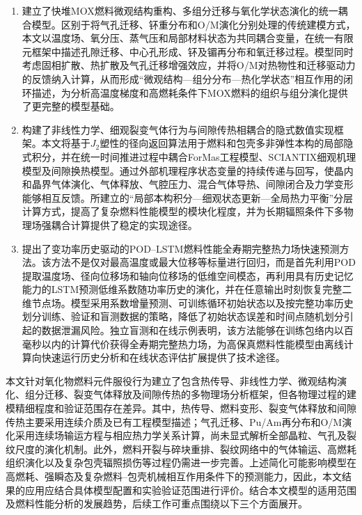 \begin{enumerate}[label={（\arabic*）},leftmargin=2.8em]
	\item 建立了快堆MOX燃料微观结构重构、多组分迁移与氧化学状态演化的统一耦合模型。区别于将气孔迁移、钚重分布和O/M演化分别处理的传统建模方式，本文以温度场、氧分压、蒸气压和局部材料状态为共同耦合变量，在统一有限元框架中描述孔隙迁移、中心孔形成、钚及镅再分布和氧迁移过程。模型同时考虑固相扩散、热扩散及气孔迁移增强效应，并将O/M对热物性和迁移驱动力的反馈纳入计算，从而形成“微观结构—组分分布—热化学状态”相互作用的闭环描述，为分析高温度梯度和高燃耗条件下MOX燃料的组织与组分演化提供了更完整的模型基础。
	
	\item 构建了非线性力学、细观裂变气体行为与间隙传热相耦合的隐式数值实现框架。本文将基于$J_2$塑性的径向返回算法用于燃料和包壳多非弹性本构的局部隐式积分，并在统一时间推进过程中耦合ForMas工程模型、SCIANTIX细观机理模型及间隙换热模型。通过外部机理程序状态变量的持续传递与回写，使晶内和晶界气体演化、气体释放、气腔压力、混合气体导热、间隙闭合及力学变形能够相互反馈。所建立的“局部本构积分—细观状态更新—全局热力平衡”分层计算方式，提高了复杂燃料性能模型的模块化程度，并为长期辐照条件下多物理场强耦合计算提供了稳定的实现途径。
	
	\item 提出了变功率历史驱动的POD--LSTM燃料性能全寿期完整热力场快速预测方法。该方法不是仅对最高温度或最大位移等标量进行回归，而是首先利用POD提取温度场、径向位移场和轴向位移场的低维空间模态，再利用具有历史记忆能力的LSTM预测低维系数随功率历史的演化，并在任意输出时刻恢复完整二维节点场。模型采用系数增量预测、可训练循环初始状态以及按完整功率历史划分训练、验证和盲测数据的策略，降低了初始状态误差和时间点随机划分引起的数据泄漏风险。独立盲测和在线示例表明，该方法能够在训练包络内以百毫秒以内的计算代价获得全寿期完整热力场，为高保真燃料性能模型由离线计算向快速运行历史分析和在线状态评估扩展提供了技术途径。
\end{enumerate}


本文针对氧化物燃料元件服役行为建立了包含热传导、非线性力学、微观结构演化、组分迁移、裂变气体释放及间隙传热的多物理场分析框架，但各物理过程的建模精细程度和验证范围存在差异。其中，热传导、燃料变形、裂变气体释放和间隙传热主要采用连续介质及已有工程模型描述；气孔迁移、Pu/Am再分布和O/M演化采用连续场输运方程与相应热力学关系计算，尚未显式解析全部晶粒、气孔及裂纹尺度的演化机制。此外，燃料开裂与碎块重排、裂纹网络中的气体输运、高燃耗组织演化以及复杂包壳辐照损伤等过程仍需进一步完善。上述简化可能影响模型在高燃耗、强瞬态及复杂燃料–包壳机械相互作用条件下的预测能力，因此，本文结果的应用应结合具体模型配置和实验验证范围进行评价。结合本文模型的适用范围及燃料性能分析的发展趋势，后续工作可重点围绕以下三个方面展开。

